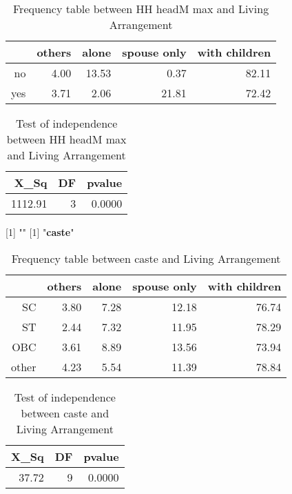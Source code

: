\documentclass[11pt]{article}
\begin{document}
\begin{table}[H]
\centering
\begin{tabular}{rrrrr}
  \hline
 & others & alone & spouse only & with children \\ 
  \hline
no & 4.00 & 13.53 & 0.37 & 82.11 \\ 
  yes & 3.71 & 2.06 & 21.81 & 72.42 \\ 
   \hline
\end{tabular}
\caption{Frequency table between HH headM max and Living Arrangement} 
\end{table}
\begin{table}[H]
\centering
\begin{tabular}{rrr}
  \hline
X\_Sq & DF & pvalue \\ 
  \hline
1112.91 & 3 & 0.0000 \\ 
   \hline
\end{tabular}
\caption{Test of independence between HH headM max and Living Arrangement} 
\end{table}
[1] "\newline"
[1] "{\bf{caste}}"
\begin{table}[H]
\centering
\begin{tabular}{rrrrr}
  \hline
 & others & alone & spouse only & with children \\ 
  \hline
SC & 3.80 & 7.28 & 12.18 & 76.74 \\ 
  ST & 2.44 & 7.32 & 11.95 & 78.29 \\ 
  OBC & 3.61 & 8.89 & 13.56 & 73.94 \\ 
  other & 4.23 & 5.54 & 11.39 & 78.84 \\ 
   \hline
\end{tabular}
\caption{Frequency table between caste and Living Arrangement} 
\end{table}
\begin{table}[H]
\centering
\begin{tabular}{rrr}
  \hline
X\_Sq & DF & pvalue \\ 
  \hline
37.72 & 9 & 0.0000 \\ 
   \hline
\end{tabular}
\caption{Test of independence between caste and Living Arrangement} 
\end{table}
\end{document}
